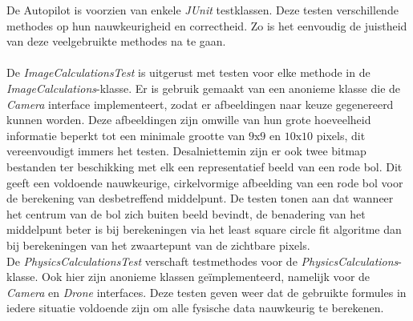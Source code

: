 
De Autopilot is voorzien van enkele \textit{JUnit} testklassen. Deze testen verschillende methodes op hun nauwkeurigheid en correctheid. Zo is het eenvoudig de juistheid van deze veelgebruikte methodes na te gaan.
\\
\\
De \textit{ImageCalculationsTest} is uitgerust met testen voor elke methode in de \textit{ImageCalculations}-klasse. Er is gebruik gemaakt van een anonieme klasse die de \textit{Camera} interface implementeert, zodat er afbeeldingen naar keuze gegenereerd kunnen worden. Deze afbeeldingen zijn omwille van hun grote hoeveelheid informatie beperkt tot een minimale grootte van \(9\text{x}9\) en \(10\text{x}10\) pixels, dit vereenvoudigt immers het testen. Desalniettemin zijn er ook twee bitmap bestanden ter beschikking met elk een representatief beeld van een rode bol. Dit geeft een voldoende nauwkeurige, cirkelvormige afbeelding van een rode bol voor de berekening van desbetreffend middelpunt. De testen tonen aan dat wanneer het centrum van de bol zich buiten beeld bevindt, de benadering van het middelpunt beter is bij berekeningen via het least square circle fit algoritme dan bij berekeningen van het zwaartepunt van de zichtbare pixels.
\\
De \textit{PhysicsCalculationsTest} verschaft testmethodes voor de \textit{PhysicsCalculations}-klasse. Ook hier zijn anonieme klassen ge\"implementeerd, namelijk voor de \textit{Camera} en \textit{Drone} interfaces. Deze testen geven weer dat de gebruikte formules in iedere situatie voldoende zijn om alle fysische data nauwkeurig te berekenen.
